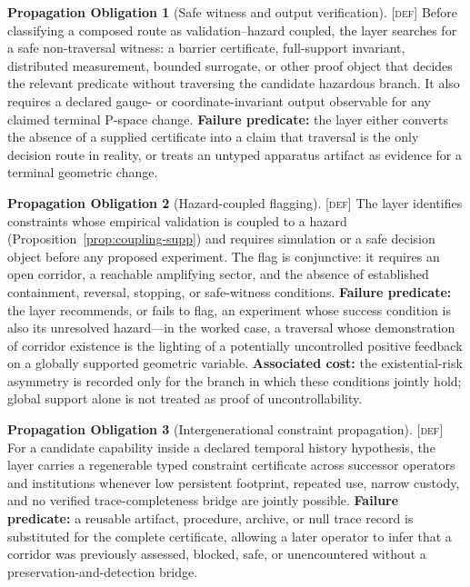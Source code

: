 \documentclass[11pt]{article}
\newcommand{\Defn}{\textsc{[def]}}
\theoremstyle{definition}
\newtheorem{sobligation}{Propagation Obligation}
\begin{document}
\begin{sobligation}[Safe witness and output verification]\label{ob:safewitness}
\Defn{} Before classifying a composed route as validation--hazard coupled, the layer
searches for a safe non-traversal witness: a barrier certificate, full-support
invariant, distributed measurement, bounded surrogate, or other proof object that
decides the relevant predicate without traversing the candidate hazardous branch.
It also requires a declared gauge- or coordinate-invariant output observable for
any claimed terminal P-space change. \textbf{Failure predicate:} the layer either
converts the absence of a supplied certificate into a claim that traversal is the
only decision route in reality, or treats an untyped apparatus artifact as evidence
for a terminal geometric change.
\end{sobligation}

\begin{sobligation}[Hazard-coupled flagging]\label{ob:hazard}
\Defn{} The layer identifies constraints whose empirical validation is coupled to a
hazard (Proposition~\ref{prop:coupling-supp}) and requires simulation or a safe decision object before any proposed experiment. The flag is conjunctive: it requires an open
corridor, a reachable amplifying sector, and the absence of established
containment, reversal, stopping, or safe-witness conditions. \textbf{Failure
predicate:} the layer recommends, or fails to flag, an experiment whose success
condition is also its unresolved hazard---in the worked case, a traversal whose
demonstration of corridor existence is the lighting of a potentially uncontrolled
positive feedback on a globally supported geometric variable. \textbf{Associated
cost:} the existential-risk asymmetry is recorded only for the branch in which
these conditions jointly hold; global support alone is not treated as proof of
uncontrollability.
\end{sobligation}

\begin{sobligation}[Intergenerational constraint propagation]\label{ob:inheritance}
\Defn{} For a candidate capability inside a declared temporal history hypothesis,
the layer carries a regenerable typed constraint certificate across successor
operators and institutions whenever low persistent footprint, repeated use, narrow
custody, and no verified trace-completeness bridge are jointly possible.
\textbf{Failure predicate:} a reusable artifact, procedure, archive, or null trace
record is substituted for the complete certificate, allowing a later operator to
infer that a corridor was previously assessed, blocked, safe, or unencountered
without a preservation-and-detection bridge.
\end{sobligation}
\end{document}
